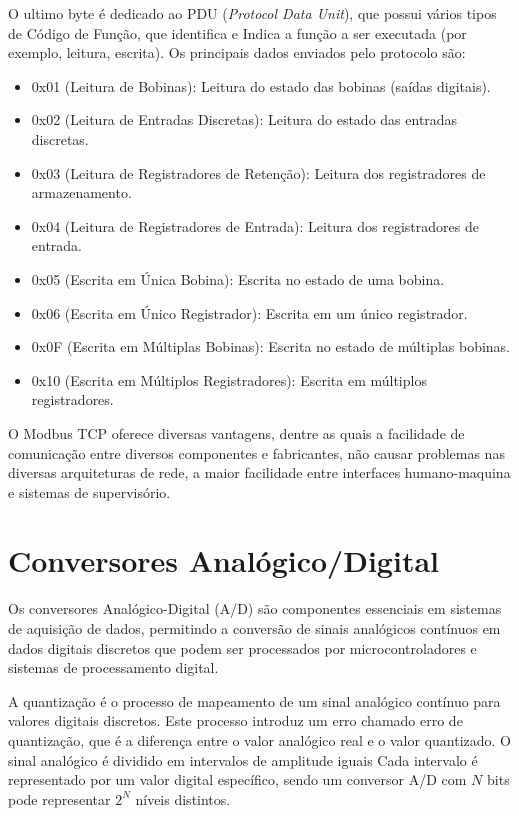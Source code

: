 O ultimo byte é dedicado ao PDU (\textit{Protocol Data Unit}), que possui vários tipos de Código de Função, que identifica e Indica a função a ser executada (por exemplo, leitura, escrita).
Os principais dados enviados pelo protocolo são:

\begin{itemize}
	\item 0x01 (Leitura de Bobinas): Leitura do estado das bobinas (saídas digitais).
	\item 0x02 (Leitura de Entradas Discretas): Leitura do estado das entradas discretas.
	\item 0x03 (Leitura de Registradores de Retenção): Leitura dos registradores de armazenamento.
    \item 0x04 (Leitura de Registradores de Entrada): Leitura dos registradores de entrada.
    \item 0x05 (Escrita em Única Bobina): Escrita no estado de uma bobina.
    \item 0x06 (Escrita em Único Registrador): Escrita em um único registrador.
    \item 0x0F (Escrita em Múltiplas Bobinas): Escrita no estado de múltiplas bobinas.
    \item 0x10 (Escrita em Múltiplos Registradores): Escrita em múltiplos registradores.
\end{itemize}

O Modbus TCP oferece diversas vantagens, dentre as quais a facilidade de comunicação entre diversos componentes e fabricantes, não causar problemas nas diversas arquiteturas de rede, a maior facilidade entre interfaces humano-maquina e sistemas de supervisório.

\section{Conversores Analógico/Digital}

Os conversores Analógico-Digital (A/D) são componentes essenciais em sistemas de aquisição de dados, permitindo a conversão de sinais analógicos contínuos em dados digitais discretos que podem ser processados por microcontroladores e sistemas de processamento digital. 

A quantização é o processo de mapeamento de um sinal analógico contínuo para valores digitais discretos. Este processo introduz um erro chamado erro de quantização, que é a diferença entre o valor analógico real e o valor quantizado. O sinal analógico é dividido em intervalos de amplitude iguais Cada intervalo é representado por um valor digital específico, sendo um conversor A/D com \( N \) bits pode representar \( 2^N \) níveis distintos.

